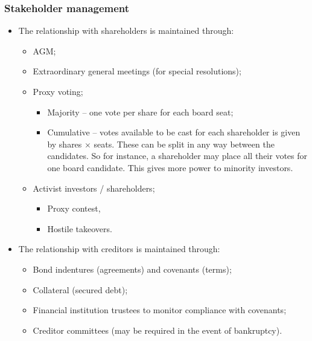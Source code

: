 \documentclass[../notes_compiled.tex]{subfiles}
\begin{document}
\subsubsection{Stakeholder management}
\label{voting}
\begin{itemize}
\item The relationship with shareholders is maintained through:
\begin{itemize}
\item  AGM;
\item Extraordinary general meetings (for special resolutions);
\item Proxy voting;
\begin{itemize}
\item Majority -- one vote per share for each board seat;
\item Cumulative -- votes available to be cast for each shareholder is given by shares $\times$ seats. These can be split in any way between the candidates. So for instance, a shareholder may place all their votes for one board candidate. This gives more power to minority investors.
\end{itemize}
\item Activist investors / shareholders;
\begin{itemize}
\item Proxy contest,
\item Hostile takeovers.
\end{itemize}
\end{itemize}

\item The relationship with creditors is maintained through:
\begin{itemize}
\item Bond indentures (agreements) and covenants (terms);
\item Collateral (secured debt);
\item Financial institution trustees to monitor compliance with covenants;
\item Creditor committees (may be required in the event of  bankruptcy).
\end{itemize}



\end{itemize}
\end{document}
